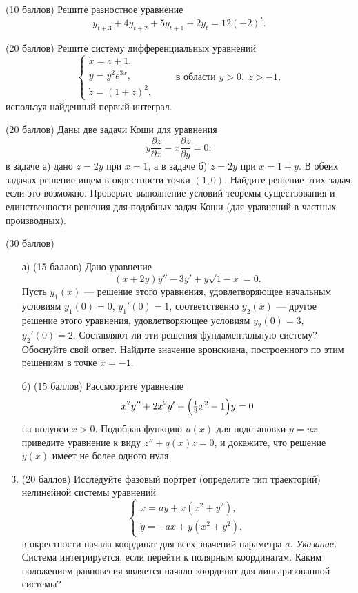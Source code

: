 \documentclass[12pt]{article}
\begin{document}

\begin{examproblems}
\item (10 баллов) Решите разностное уравнение
\[
y_{t+3}+4y_{t+2}+5y_{t+1}+2y_{t}=12(-2)^{t}.
\]

\item (20 баллов) Решите систему дифференциальных уравнений
\[
\begin{cases}
\dot{x}=z+1,\\[4pt]
\dot{y}=y^{2} e^{3x},\\[4pt]
\dot{z}=(1+z)^{2},
\end{cases}
\qquad
\text{в области } y>0,\; z>-1,
\]
используя найденный первый интеграл.

\item (20 баллов) Даны две задачи Коши для уравнения
\[
y \frac{\partial z}{\partial x}-x \frac{\partial z}{\partial y}=0:
\]
в задаче а) дано $z=2y$ при $x=1$, а в задаче б) $z=2y$ при $x=1+y$.
В обеих задачах решение ищем в окрестности точки $(1,0)$. Найдите решение этих задач, если это возможно. Проверьте выполнение условий теоремы существования и единственности решения для подобных задач Коши (для уравнений в частных производных).

\item (30 баллов)
\begin{enumerate}
\item[а) (15 баллов)] Дано уравнение
\[
(x+2y)y'' - 3y' + y\sqrt{1-x}=0.
\]
Пусть $y_{1}(x)$ — решение этого уравнения, удовлетворяющее начальным условиям $y_{1}(0)=0$, $y_{1}'(0)=1$, соответственно $y_{2}(x)$ — другое решение этого уравнения, удовлетворяющее условиям $y_{2}(0)=3$, $y_{2}'(0)=2$. Составляют ли эти решения фундаментальную систему? Обоснуйте свой ответ. Найдите значение вронскиана, построенного по этим решениям в точке $x=-1$.

\item[б) (15 баллов)] Рассмотрите уравнение
\[
x^{2}y''+2x^{2} y'+\Bigl(\tfrac{1}{3}x^{2}-1\Bigr)y=0
\]
на полуоси $x>0$. Подобрав функцию $u(x)$ для подстановки $y=ux$, приведите уравнение к виду $z''+q(x)z=0$, и докажите, что решение $y(x)$ имеет не более одного нуля.
\item (20 баллов) Исследуйте фазовый портрет (определите тип траекторий) нелинейной системы уравнений
\[
\begin{cases}
\dot{x}=ay+x(x^{2}+y^{2}),\\[4pt]
\dot{y}=-ax+y(x^{2}+y^{2}),
\end{cases}
\]
в окрестности начала координат для всех значений параметра $a$.
\textit{Указание.} Система интегрируется, если перейти к полярным координатам. Каким положением равновесия является начало координат для линеаризованной системы?
\end{enumerate}
\end{examproblems}
\end{document}
